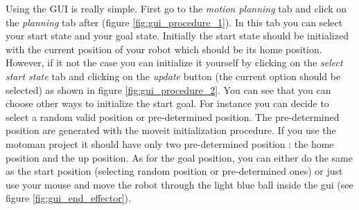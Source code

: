 Using the GUI is really simple. First go to the \emph{motion planning} tab and click on the \emph{planning} tab after (figure \ref{fig:gui_procedure_1}). In this tab you can select your start state and your goal state. Initially the start state should be initialized with the current position of your robot which should be its home position. However, if it not the case you can initialize it yourself by clicking on the \emph{select start state} tab and clicking on the \emph{update} button (the current option should be selected) as shown in figure \ref{fig:gui_procedure_2}. You can see that you can choose other ways to initialize the start goal. For instance you can decide to select a random valid position or pre-determined position. The pre-determined position are generated with the moveit initialization procedure. If you use the motoman project it should have only two pre-determined position : the home position and the up position. As for the goal position, you can either do the same as the start position (selecting random position or pre-determined ones) or just use your mouse and move the robot through the light blue ball inside the gui (see figure \ref{fig:gui_end_effector}).
